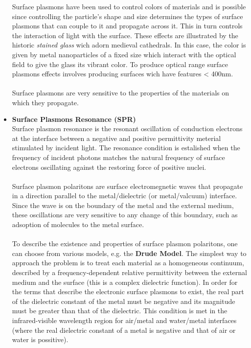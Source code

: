 \begin{itemize}
Surface plasmons have been used to control colors of materials and is possible since controlling 
the particle's shape and size determines the types of surface plasmons that can couple to it and 
propagate across it. This in turn controls the interaction of light with the surface.
These effects are illustrated by the historic \textit{stained glass} wich adorn medieval
cathedrals. In this case, the color is given by metal nanoparticles of a fixed size which interact
with the optical field to give the glass its vibrant color. To produce optical range surface plasmons
effects involves producing surfaces wich have features < 400nm.
\\
\\
Surface plasmons are very sensitive to the properties of the materials on which they propagate.


\item \textbf{Surface Plasmons Resonance (SPR)} \\
Surface plasmon resonance is the resonant oscillation of conduction electrons at the interface
between a negative and positive permittivity meterial stimulated by incident light. The resonance
condition is estalished when the frequency of incident photons matches the natural
frequency of surface electrons oscillating against the restoring force of positive nuclei.
\\
\\
Surface plasmon polaritons are surface electromegnetic waves that propagate in a direction parallel to
the metal/dielectric (or metal/valcuum) interface. Since the wave is on the boundary of the metal
and the external medium, these oscillations are very sensitive to any change of this boundary, such as
adsoption of molecules to the metal surface.
\\
\\
To describe the existence and properties of surface plasmon polaritons, one can choose from various models,
e.g. the \textbf{Drude Model}. The simplest way to approach the problem is to treat each
material as a homogeneous continuum, described by a frequency-dependent relative permittivity between 
the external medium and the surface (this is a complex dielectric function). In order
for the terms that describe the electronic surface plasmons to exist, the real part of the dielectric constant
of the metal must be negative and its magnitude must be greater than that of the dielectric.
This condition is met in the infrared-visible wavelength region for air/metal and water/metal interfaces (where
the real dielectric constant of a metal is negative and that of air or water is possitive).

\end{itemize}
